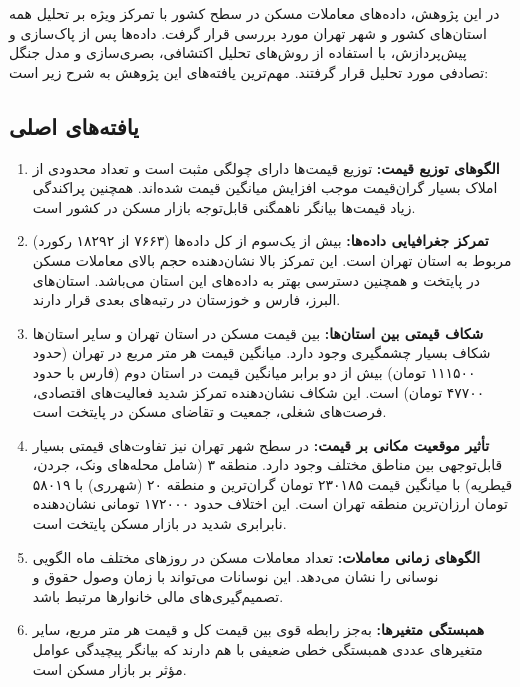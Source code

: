 \documentclass[twoside,reqno]{amsart}
\begin{document}
در این پژوهش، داده‌های معاملات مسکن در سطح کشور با تمرکز ویژه بر تحلیل همه استان‌های کشور و شهر تهران مورد بررسی قرار گرفت. داده‌ها پس از پاک‌سازی و پیش‌پردازش، با استفاده از روش‌های تحلیل اکتشافی، بصری‌سازی و مدل جنگل تصادفی مورد تحلیل قرار گرفتند. مهم‌ترین یافته‌های این پژوهش به شرح زیر است:

\subsection{یافته‌های اصلی}

\begin{enumerate}
\item \textbf{الگوهای توزیع قیمت:} توزیع قیمت‌ها دارای چولگی مثبت است و تعداد محدودی از املاک بسیار گران‌قیمت موجب افزایش میانگین قیمت شده‌اند. همچنین پراکندگی زیاد قیمت‌ها بیانگر ناهمگنی قابل‌توجه بازار مسکن در کشور است.
                    
\item \textbf{تمرکز جغرافیایی داده‌ها:} بیش از یک‌سوم از کل داده‌ها (۷۶۶۳ از ۱۸۲۹۲ رکورد) مربوط به استان تهران است. این تمرکز بالا نشان‌دهنده حجم بالای معاملات مسکن در پایتخت و همچنین دسترسی بهتر به داده‌های این استان می‌باشد. استان‌های البرز، فارس و خوزستان در رتبه‌های بعدی قرار دارند.
    
\item \textbf{شکاف قیمتی بین استان‌ها:} بین قیمت مسکن در استان تهران و سایر استان‌ها شکاف بسیار چشمگیری وجود دارد. میانگین قیمت هر متر مربع در تهران (حدود ۱۱۱۵۰۰ تومان) بیش از دو برابر میانگین قیمت در استان دوم (فارس با حدود ۴۷۷۰۰ تومان) است. این شکاف نشان‌دهنده تمرکز شدید فعالیت‌های اقتصادی، فرصت‌های شغلی، جمعیت و تقاضای مسکن در پایتخت است.

\item \textbf{تأثیر موقعیت مکانی بر قیمت:} در سطح شهر تهران نیز تفاوت‌های قیمتی بسیار قابل‌توجهی بین مناطق مختلف وجود دارد. منطقه ۳ (شامل محله‌های ونک، جردن، قیطریه) با میانگین قیمت ۲۳۰۱۸۵ تومان گران‌ترین و منطقه ۲۰ (شهرری) با ۵۸۰۱۹ تومان ارزان‌ترین منطقه تهران است. این اختلاف حدود ۱۷۲۰۰۰ تومانی نشان‌دهنده نابرابری شدید در بازار مسکن پایتخت است.

\item \textbf{الگوهای زمانی معاملات:} تعداد معاملات مسکن در روزهای مختلف ماه الگویی نوسانی را نشان می‌دهد. این نوسانات می‌تواند با زمان وصول حقوق و تصمیم‌گیری‌های مالی خانوارها مرتبط باشد.
            
\item \textbf{همبستگی متغیرها:} به‌جز رابطه قوی بین قیمت کل و قیمت هر متر مربع، سایر متغیرهای عددی همبستگی خطی ضعیفی با هم دارند که بیانگر پیچیدگی عوامل مؤثر بر بازار مسکن است.
                

\end{enumerate}
\end{document}
